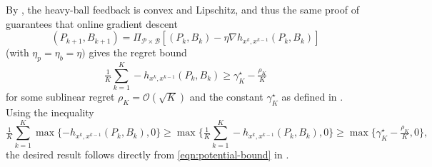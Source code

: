By , the heavy-ball feedback is convex and Lipschitz, and thus the same proof of  guarantees that online gradient descent 
\begin{equation*}
  (P_{k + 1}, B_{k+1}) = \Pi_{\mathcal{P} \times \mathcal{B}} [(P_k, B_k) - \eta \nabla h_{x^k, x^{k-1}} (P_k, B_k)]
\end{equation*}
(with $\eta_p = \eta_b = \eta)$ gives the regret bound
\begin{equation*}
  \tfrac{1}{K} \textstyle \sum_{k=1}^K - h_{x^k, x^{k-1}}(P_k, B_k) \geq 
  \gamma_K^{\star} - \tfrac{\rho_K}{K}
\end{equation*}
for some sublinear regret $\rho_K = \mathcal{O}(\sqrt{K})$ and the constant $\gamma_K^{\star}$ as defined in . 
Using the inequality
\begin{equation*}
  \tfrac{1}{K} \textstyle \sum_{k=1}^K \max \{ - h_{x^k, x^{k-1}}(P_k, B_k), 0 \}
  \geq \max \big \{\tfrac{1}{K} \textstyle \sum_{k=1}^K - h_{x^k, x^{k-1}}(P_k, B_k), 0 \big\} \geq \max \{ \gamma_K^{\star} - \tfrac{\rho_K}{K}, 0 \},
\end{equation*}
the desired result follows directly from \eqref{eqn:potential-bound} in .

